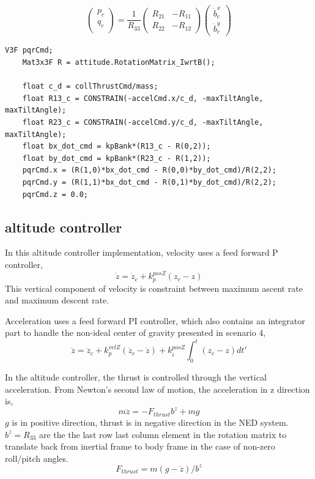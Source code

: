 \documentclass[a4paper]{article}
\begin{document}
$$
\begin{pmatrix} p_c \\ q_c \\ \end{pmatrix}  = \frac{1}{R_{33}}\begin{pmatrix} R_{21} & -R_{11} \\ R_{22} & -R_{12} \end{pmatrix} \begin{pmatrix} \dot{b}^x_c \\ \dot{b}^y_c  \end{pmatrix} 
$$

\begin{lstlisting}[frame=single]
    V3F pqrCmd;
    Mat3x3F R = attitude.RotationMatrix_IwrtB();
    
    float c_d = collThrustCmd/mass;
    float R13_c = CONSTRAIN(-accelCmd.x/c_d, -maxTiltAngle, maxTiltAngle);
    float R23_c = CONSTRAIN(-accelCmd.y/c_d, -maxTiltAngle, maxTiltAngle);
    float bx_dot_cmd = kpBank*(R13_c - R(0,2));
    float by_dot_cmd = kpBank*(R23_c - R(1,2));
    pqrCmd.x = (R(1,0)*bx_dot_cmd - R(0,0)*by_dot_cmd)/R(2,2);
    pqrCmd.y = (R(1,1)*bx_dot_cmd - R(0,1)*by_dot_cmd)/R(2,2);
    pqrCmd.z = 0.0;
\end{lstlisting}

\subsection{altitude controller} \label{control:altitude}

In this altitude controller implementation, velocity uses a feed forward P controller,
$$\dot{z} = \dot{z}_c  + k_{p}^{posZ}(z_{c} - z) $$
This vertical component of velocity is constraint between maximum ascent rate and maximum descent rate.

Acceleration uses a feed forward PI controller, which also contains an integrator part to handle the non-ideal center of gravity presented in scenario 4,
$$\ddot{z} = \ddot{z}_c + k_{p}^{velZ}(\dot{z}_{c} - \dot{z}) + k_i^{posZ}\int_0^t(z_{c} - z)dt'$$ 

In the altitude controller, the thrust is controlled through the vertical acceleration. From Newton's second law of motion, the acceleration in z direction is,
$$ m \ddot{z} = - F_{thrust} b^z + m g$$
$g$ is in positive direction, thrust is in negative direction in the NED system. $b^z = R_{33}$ are the the last row last column element in the rotation matrix to translate back from inertial frame to body frame in the case of non-zero roll/pitch angles.
$$ F_{thrust} = m (g - \ddot{z})/b^z$$ 
\end{document}
